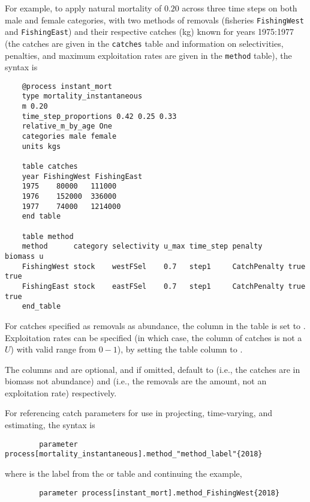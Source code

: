 For example, to apply natural mortality of $0.20$ across three time steps on both male and female categories, with two methods of removals (fisheries \texttt{FishingWest} and \texttt{FishingEast}) and their respective catches (kg) known for years 1975:1977 (the catches are given in the \texttt{catches} table and information on selectivities, penalties, and maximum exploitation rates are given in the \texttt{method} table), the syntax is

{\small{\begin{verbatim}
	@process instant_mort
	type mortality_instantaneous
	m 0.20
	time_step_proportions 0.42 0.25 0.33
	relative_m_by_age One
	categories male female
	units kgs

	table catches
	year FishingWest FishingEast
	1975	80000	111000
	1976	152000	336000
	1977	74000	1214000
	end table

	table method
	method      category selectivity u_max time_step penalty      biomass u
	FishingWest stock    westFSel    0.7   step1     CatchPenalty true    true
	FishingEast stock    eastFSel    0.7   step1     CatchPenalty true    true
	end_table
	\end{verbatim}}}

For catches specified as removals as abundance, the column  in the  table is set to . Exploitation rates can be specified (in which case, the column of catches is not a $U$) with valid range from $0-1$), by setting the  table column  to .

The columns  and  are optional, and if omitted, default to  (i.e., the catches are in biomass not abundance) and  (i.e., the removals are the amount, not an exploitation rate) respectively. 

For referencing catch parameters for use in projecting, time-varying, and estimating, the syntax is
{\small{\begin{verbatim}
		parameter process[mortality_instantaneous].method_"method_label"{2018}
\end{verbatim}}}

where  is the label from the  or  table and continuing the example,

{\small{\begin{verbatim}
		parameter process[instant_mort].method_FishingWest{2018}
\end{verbatim}}}

